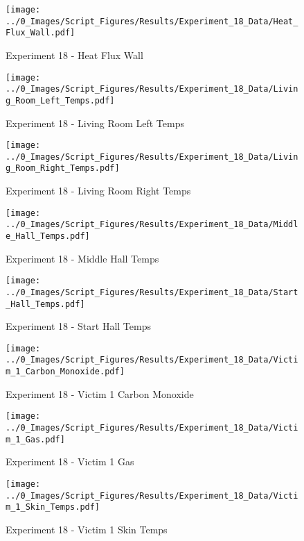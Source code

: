 	\begin{figure}[H]
		\centering
		\texttt{[image: ../0\_Images/Script\_Figures/Results/Experiment\_18\_Data/Heat\_Flux\_Wall.pdf]}
		\caption[]{Experiment 18 - Heat Flux Wall}
	\end{figure}
 
	\clearpage

	\begin{figure}[H]
		\centering
		\texttt{[image: ../0\_Images/Script\_Figures/Results/Experiment\_18\_Data/Living\_Room\_Left\_Temps.pdf]}
		\caption[]{Experiment 18 - Living Room Left Temps}
	\end{figure}
 

	\begin{figure}[H]
		\centering
		\texttt{[image: ../0\_Images/Script\_Figures/Results/Experiment\_18\_Data/Living\_Room\_Right\_Temps.pdf]}
		\caption[]{Experiment 18 - Living Room Right Temps}
	\end{figure}
 
	\clearpage

	\begin{figure}[H]
		\centering
		\texttt{[image: ../0\_Images/Script\_Figures/Results/Experiment\_18\_Data/Middle\_Hall\_Temps.pdf]}
		\caption[]{Experiment 18 - Middle Hall Temps}
	\end{figure}
 

	\begin{figure}[H]
		\centering
		\texttt{[image: ../0\_Images/Script\_Figures/Results/Experiment\_18\_Data/Start\_Hall\_Temps.pdf]}
		\caption[]{Experiment 18 - Start Hall Temps}
	\end{figure}
 
	\clearpage

	\begin{figure}[H]
		\centering
		\texttt{[image: ../0\_Images/Script\_Figures/Results/Experiment\_18\_Data/Victim\_1\_Carbon\_Monoxide.pdf]}
		\caption[]{Experiment 18 - Victim 1 Carbon Monoxide}
	\end{figure}
 

	\begin{figure}[H]
		\centering
		\texttt{[image: ../0\_Images/Script\_Figures/Results/Experiment\_18\_Data/Victim\_1\_Gas.pdf]}
		\caption[]{Experiment 18 - Victim 1 Gas}
	\end{figure}
 
	\clearpage

	\begin{figure}[H]
		\centering
		\texttt{[image: ../0\_Images/Script\_Figures/Results/Experiment\_18\_Data/Victim\_1\_Skin\_Temps.pdf]}
		\caption[]{Experiment 18 - Victim 1 Skin Temps}
	\end{figure}
 

